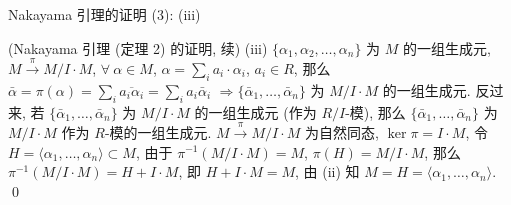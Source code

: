 
\begin{frame}{Nakayama 引理的证明 (3): (iii)}

\startproof[bg=yellow, fg=red](Nakayama 引理 (定理 2) 的证明, 续)
(iii) $\{ \alpha_1, \alpha_2, \dots, \alpha_n \}$ 为 $M$ 的一组生成元,
$M \xrightarrow{\ \pi\ } M/I \cdot M$, $\forall\ \alpha \in M$,
$\alpha = \sum_i a_i \cdot \alpha_i$, $a_i \in R$,
那么 $\bar{\alpha} = \pi(\alpha) = \sum_i \overline{a_i \alpha_i}
= \sum_i a_i \bar{\alpha}_i$
$\Longrightarrow \{ \bar{\alpha}_1, \dots, \bar{\alpha}_n \}$ 为
$M/I \cdot M$ 的一组生成元.
反过来, 若 $\{ \bar{\alpha}_1, \dots, \bar{\alpha}_n \}$ 为
$M/I \cdot M$ 的一组生成元 (作为 $R/I$-模),
那么 $\{ \bar{\alpha}_1, \dots, \bar{\alpha}_n \}$ 为 $M/I \cdot M$
作为 $R$-模的一组生成元.
\pause
$M \xrightarrow{\ \pi\ } M/I \cdot M$ 为自然同态, $\ker \pi = I \cdot M$,
令 $H = \langle \alpha_1, \dots, \alpha_n \rangle \subset M$,
由于 $\pi^{-1}(M/I \cdot M) = M$, $\pi(H) = M/I \cdot M$,
那么 $\pi^{-1}(M/I \cdot M) = H + I \cdot M$, 即 $H + I \cdot M = M$,
由 (ii) 知 $M = H = \langle \alpha_1, \dots, \alpha_n \rangle$.
\qed

\end{frame}



